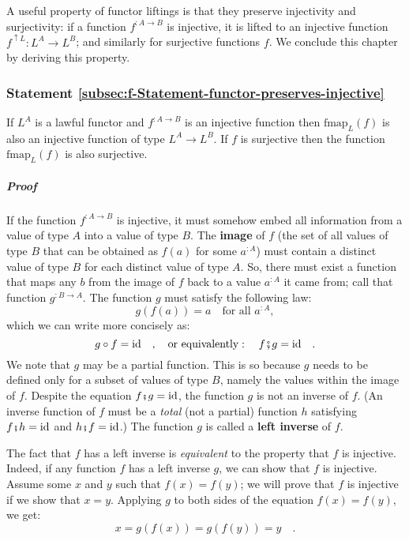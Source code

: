 A useful property of functor liftings is that they preserve injectivity
and surjectivity: if a function $f^{:A\rightarrow B}$ is injective,
it is lifted to an injective function $f^{\uparrow L}:L^{A}\rightarrow L^{B}$;
and similarly for surjective functions $f$. We conclude this chapter
by deriving this property.

\subsubsection{Statement \label{subsec:f-Statement-functor-preserves-injective}\ref{subsec:f-Statement-functor-preserves-injective}}

If $L^{A}$ is a lawful functor and $f^{:A\rightarrow B}$ is an injective
function then $\text{fmap}_{L}(f)$ is also an injective function
of type $L^{A}\rightarrow L^{B}$. If $f$ is surjective then the
function $\text{fmap}_{L}(f)$ is also surjective.

\subparagraph{Proof}

If the function $f^{:A\rightarrow B}$ is injective, it must somehow
embed all information from a value of type $A$ into a value of type
$B$. The \textbf{image} of $f$ (the
set of all values of type $B$ that can be obtained as $f(a)$ for
some $a^{:A}$) must contain a distinct value of type $B$ for each
distinct value of type $A$. So, there must exist a function that
maps any $b$ from the image of $f$ back to a value $a^{:A}$ it
came from; call that function $g^{:B\rightarrow A}$. The function
$g$ must satisfy the following law:
\[
g(f(a))=a\quad\text{for all }a^{:A},
\]
which we can write more concisely as:
\[
g\circ f=\text{id}\quad,\quad\text{or equivalently}:\quad f\bef g=\text{id}\quad.
\]
We note that $g$ may be a partial function.
This is so because $g$ needs to be defined only for a subset of values
of type $B$, namely the values within the image of $f$. Despite
the equation $f\bef g=\text{id}$, the function $g$ is not an inverse
of $f$. (An inverse function of $f$ must
be a \emph{total} (not a partial) function $h$ satisfying $f\bef h=\text{id}$
and $h\bef f=\text{id}$.) The function $g$ is called a \textbf{left
inverse} of $f$.

The fact that $f$ has a left inverse is \emph{equivalent} to the
property that $f$ is injective. Indeed, if any function $f$ has
a left inverse $g$, we can show that $f$ is injective. Assume some
$x$ and $y$ such that $f(x)=f(y)$; we will prove that $f$ is injective
if we show that $x=y$. Applying $g$ to both sides of the equation
$f(x)=f(y)$, we get:
\[
x=g(f(x))=g(f(y))=y\quad.
\]


